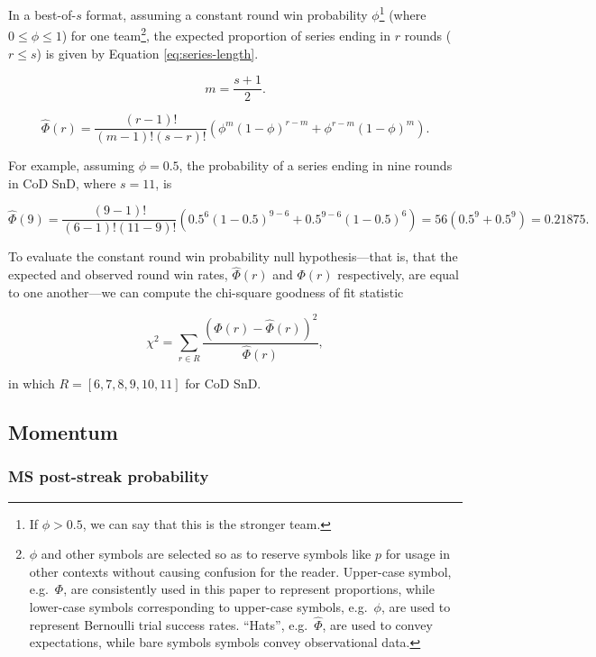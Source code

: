 \documentclass{article}
\begin{document}
In a best-of-\(s\) format, assuming a constant round win probability
\(\phi\)\footnote{If \(\phi > 0.5\), we can say that this is the
  stronger team.} (where \(0 \leq \phi \leq 1\)) for one
team\footnote{\(\phi\) and other symbols are selected so as to reserve
  symbols like \(p\) for usage in other contexts without causing
  confusion for the reader. Upper-case symbol, e.g.~\(\Phi\), are
  consistently used in this paper to represent proportions, while
  lower-case symbols corresponding to upper-case symbols, e.g.~\(\phi\),
  are used to represent Bernoulli trial success rates. ``Hats'',
  e.g.~\(\hat{\Phi}\), are used to convey expectations, while bare
  symbols symbols convey observational data.}, the expected proportion
of series ending in \(r\) rounds (\(r \leq s\)) is given by Equation
\ref{eq:series-length}.

\begin{equation}\label{eq:m}
m = \frac{s + 1}{2}.
\end{equation}

\begin{equation}\label{eq:series-length}
\hat{\Phi}(r) = \frac{(r - 1)!}{(m - 1)!(s - r)!}(\phi^{m}(1 - \phi)^{r - m} + \phi^{r - m}(1 - \phi)^m).
\end{equation}

For example, assuming \(\phi = 0.5\), the probability of a series ending
in nine rounds in CoD SnD, where \(s=11\), is

\[
\hat{\Phi}(9) = \frac{(9 - 1)!}{(6 - 1)!(11 - 9)!}(0.5^{6}(1 - 0.5)^{9 - 6} + 0.5^{9 - 6}(1 - 0.5)^6) = 56 (0.5^9 + 0.5^9) = 0.21875.
\]

To evaluate the constant round win probability null hypothesis---that
is, that the expected and observed round win rates, \(\hat{\Phi}(r)\)
and \(\Phi(r)\) respectively, are equal to one another---we can compute
the chi-square goodness of fit statistic

\begin{equation}\label{eq:chi-squ}
\chi^2 = \sum_{r \in R} \frac{(\Phi(r) - \hat{\Phi}(r))^2}{\hat{\Phi}(r)},
\end{equation}

in which \(R = [6, 7, 8, 9, 10, 11]\) for CoD SnD.

\hypertarget{momentum}{%
\subsection{Momentum}\label{momentum}}

\hypertarget{ms-post-streak-probability}{%
\subsubsection{MS post-streak
probability}\label{ms-post-streak-probability}}
\end{document}
